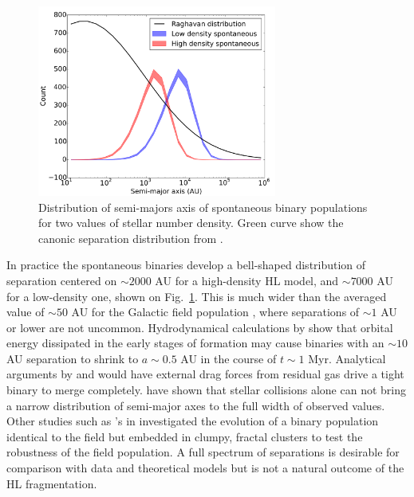 \begin{figure}
\begin{center}
\includegraphics[width=0.7\textwidth]{Figures/5_spontaneous_smaxis}
\caption{Distribution of semi-majors axis of spontaneous binary populations for two values of stellar number density. Green curve show the canonic separation distribution from \protect\cite{Raghavan2010}. }
\label{Fig:5_spontaneous_smaxis}
\end{center}
\end{figure}


In practice the spontaneous binaries develop a bell-shaped  distribution of separation centered on $\sim 2000$ AU for a high-density HL model,  and $\sim 7000$ AU for a low-density one, shown on Fig.~\ref{Fig:5_spontaneous_smaxis}. This is much wider than the averaged value of $\sim 50$ AU for the Galactic field population \citep{DM91,Raghavan2010}, where separations of $\sim 1 $ AU or lower are not uncommon. Hydrodynamical calculations by \cite{Bate2012} show that orbital energy dissipated in the early stages of formation may cause binaries with an $\sim 10 $ AU  separation to shrink to $ a \sim  0.5 $ AU in the course of $t \sim 1 $ Myr. Analytical arguments by \cite{Stahler2010} and \cite{Korntreff2012} would have external drag forces from residual gas drive a tight binary to merge completely. \cite{Kroupa2001} have shown that stellar collisions  alone can not bring a narrow distribution of semi-major axes to the full width of observed values. Other studies such as \citeauthor{Parker2014}'s in \citeyear{Parker2014} investigated the evolution of a binary population identical to the field but embedded in clumpy, fractal clusters \citep{Goodwin2004} to test the robustness of the field population. 
A full spectrum of separations is desirable for comparison with data and theoretical models but is not a  natural outcome of the HL fragmentation. 

